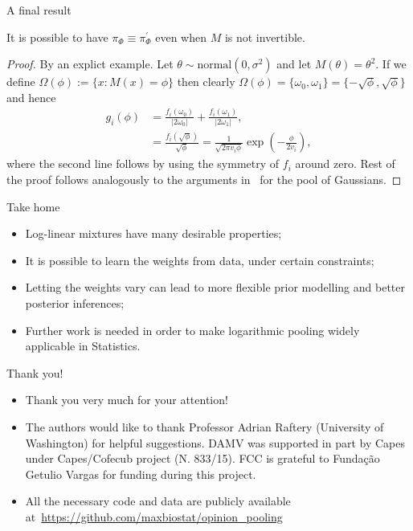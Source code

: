 \begin{frame}{A final result}
\begin{remark}
 \label{rmk:invertibleIFF}
 It is possible to have  $\pi_\Phi \equiv \pi_\Phi^{\prime}$ even when $M$ is not invertible.
\end{remark}
\begin{proof}
 By an explict example. 
 Let $\theta \sim \text{normal}(0, \sigma^2)$ and let $M(\theta) = \theta^2$.
 If we define $\Omega(\phi) := \{ x: M(x) = \phi \}$ then clearly $\Omega(\phi) = \{ \omega_0, \omega_1 \} = \{ -\sqrt{\phi}, \sqrt{\phi} \}$ and hence
 \begin{align*}
 \label{eq:normalInvert}
 g_i(\phi) &= \frac{f_i(\omega_0)}{|2\omega_0|} + \frac{f_i(\omega_1)}{|2\omega_1|}, \\
        &= \frac{f_i(\sqrt{\phi})}{\sqrt{\phi}} = \frac{1}{\sqrt{2\pi v_i \phi}} \exp\left(-\frac{\phi}{2v_i}\right),
\end{align*}
where the second line follows by using the symmetry of $f_i$ around zero.
Rest of the proof follows analogously to the arguments in~\cite{Carvalho2019} for the pool of Gaussians.
\end{proof}
\end{frame}
\begin{frame}{Take home}
\begin{itemize}[label={$\tau_h$}]
 \item Log-linear mixtures have many desirable properties;\pause
 \item It is possible to learn the weights from data, under certain constraints;\pause
 \item Letting the weights vary can lead to more flexible prior modelling and better posterior inferences;\pause
 \item Further work is needed in order to make logarithmic pooling widely applicable in Statistics.
\end{itemize}
\end{frame}
\begin{frame}{Thank you!}
 \begin{itemize}
  \item Thank you very much for your attention!
  \item The authors would like to thank Professor Adrian Raftery (University of Washington) for helpful suggestions.
DAMV was supported in part by Capes under Capes/Cofecub project (N. 833/15).
FCC is grateful to Funda\c{c}\~ao Getulio Vargas for funding during this project.
  \item All the necessary code and data are publicly available at~\url{https://github.com/maxbiostat/opinion_pooling}
 \end{itemize}
\end{frame}
